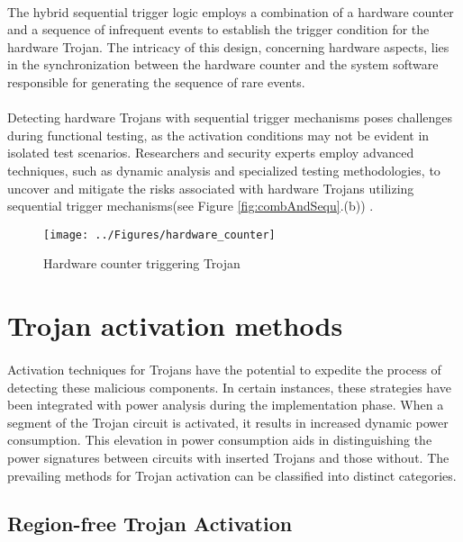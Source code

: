 \paragraph*{}
The hybrid sequential trigger logic employs a combination of a hardware counter and a sequence of infrequent events to establish the trigger condition for the hardware Trojan. The intricacy of this design, concerning hardware aspects, lies in the synchronization between the hardware counter and the system software responsible for generating the sequence of rare events.
\paragraph*{}
Detecting hardware Trojans with sequential trigger mechanisms poses challenges during functional testing, as the activation conditions may not be evident in isolated test scenarios. Researchers and security experts employ advanced techniques, such as dynamic analysis and specialized testing methodologies, to uncover and mitigate the risks associated with hardware Trojans utilizing sequential trigger mechanisms(see Figure \ref*{fig:combAndSequ}.(b)) .
\begin{figure}[h]
	\centering
	\texttt{[image: ../Figures/hardware\_counter]}
	\caption{Hardware counter triggering Trojan}
	\label{fig:hardwarecounter}
\end{figure}

\section{Trojan activation methods}
\paragraph*{}
Activation techniques for Trojans have the potential to expedite the process of detecting these malicious components. In certain instances, these strategies have been integrated with power analysis during the implementation phase. When a segment of the Trojan circuit is activated, it results in increased dynamic power consumption. This elevation in power consumption aids in distinguishing the power signatures between circuits with inserted Trojans and those without. The prevailing methods for Trojan activation can be classified into distinct categories.

\subsection{Region-free Trojan Activation}
